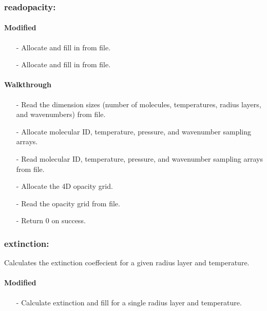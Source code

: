 \documentclass[letterpaper,12pt]{article}
\begin{document}
\subsubsection{readopacity:}
\paragraph{Modified}
\begin{enumerate}[leftmargin=10pt, noitemsep, parsep=0pt, topsep=0ex]
\item[-] Allocate  and fill in from file.
\item[-] Allocate  and fill in from file.
\end{enumerate}

\paragraph{Walkthrough}
\begin{enumerate}[leftmargin=10pt, noitemsep, parsep=0pt, topsep=0ex]
\item[-] Read the dimension sizes (number of molecules, temperatures, radius layers, and wavenumbers) from file.
\item[-] Allocate molecular ID, temperature, pressure, and wavenumber sampling arrays.
\item[-] Read molecular ID, temperature, pressure, and wavenumber sampling arrays from file.
\item[-] Allocate the 4D opacity grid.
\item[-] Read the opacity grid from file.
\item[-] Return 0 on success.
\end{enumerate}

\subsubsection{extinction:}
Calculates the extinction coeffecient for a given radius layer and temperature.
\paragraph{Modified}
\begin{enumerate}[leftmargin=10pt, noitemsep, parsep=0pt, topsep=0ex]
\item[-] Calculate extinction and fill  for a single radius layer and temperature.
\end{enumerate}
\end{document}
